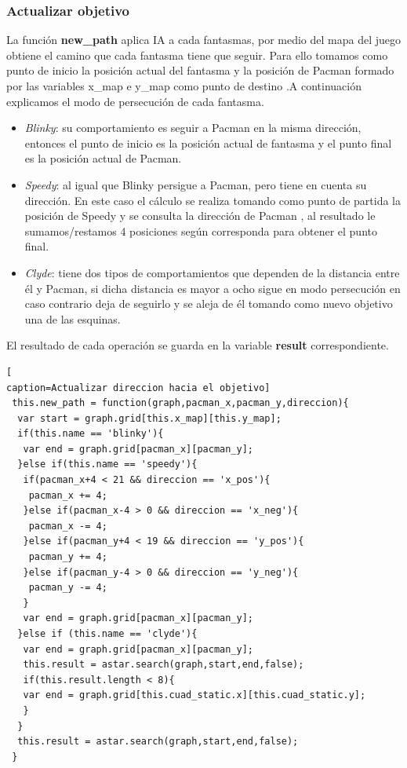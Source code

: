 \subsubsection*{Actualizar objetivo}
La función \textbf{new\_path} aplica IA a cada fantasmas, por medio del mapa del juego obtiene el camino que cada fantasma tiene que seguir. Para ello tomamos como punto de inicio la posición actual del fantasma y la posición de Pacman formado por las variables x\_map e y\_map como punto de destino .A continuación explicamos el modo de persecución de cada fantasma.
\begin{itemize}
\item \textit{Blinky}: su comportamiento es seguir a Pacman en la misma dirección, entonces el punto de inicio es la posición actual de fantasma y el punto final es la posición actual de Pacman.
\item \textit{Speedy}: al igual que Blinky persigue a Pacman, pero tiene en cuenta su dirección. En este caso el cálculo se realiza tomando como punto de partida la posición de Speedy y se consulta la dirección de Pacman , al resultado le sumamos/restamos 4 posiciones según corresponda para obtener el punto final.
\item \textit{Clyde}: tiene dos tipos de comportamientos que dependen de la distancia entre él y Pacman, si dicha distancia es mayor a ocho sigue en modo persecución en caso contrario deja de seguirlo y se aleja de él tomando como nuevo objetivo una de las esquinas.
\end{itemize}
El resultado de cada operación se guarda en la variable \textbf{result} correspondiente.
\begin{lstlisting}[
caption=Actualizar direccion hacia el objetivo]
 this.new_path = function(graph,pacman_x,pacman_y,direccion){
  var start = graph.grid[this.x_map][this.y_map];
  if(this.name == 'blinky'){
   var end = graph.grid[pacman_x][pacman_y];
  }else if(this.name == 'speedy'){
   if(pacman_x+4 < 21 && direccion == 'x_pos'){
    pacman_x += 4;
   }else if(pacman_x-4 > 0 && direccion == 'x_neg'){
    pacman_x -= 4;
   }else if(pacman_y+4 < 19 && direccion == 'y_pos'){
    pacman_y += 4;
   }else if(pacman_y-4 > 0 && direccion == 'y_neg'){
    pacman_y -= 4;
   }
   var end = graph.grid[pacman_x][pacman_y];
  }else if (this.name == 'clyde'){
   var end = graph.grid[pacman_x][pacman_y];
   this.result = astar.search(graph,start,end,false);
   if(this.result.length < 8){
   var end = graph.grid[this.cuad_static.x][this.cuad_static.y];
   }
  }
  this.result = astar.search(graph,start,end,false);
 }
\end{lstlisting}
